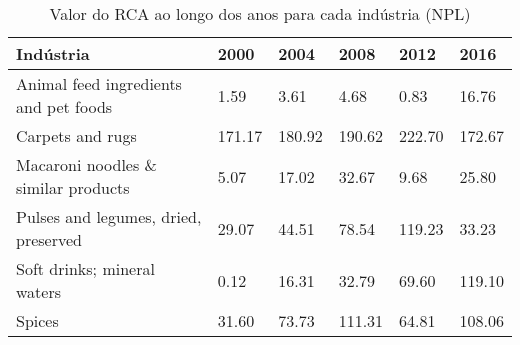 \begin{table}
\centering
\caption{Valor do RCA ao longo dos anos para cada indústria (NPL)}
\label{tab:ex3-tempo-NPL}
\begin{tabular}{p{6cm}p{1.5cm}p{1.5cm}p{1.5cm}p{1.5cm}p{1.5cm}}
\toprule
                            Indústria &   2000 &   2004 &   2008 &   2012 &   2016 \\
\midrule
Animal feed ingredients and pet foods &   1.59 &   3.61 &   4.68 &   0.83 &  16.76 \\
                     Carpets and rugs & 171.17 & 180.92 & 190.62 & 222.70 & 172.67 \\
  Macaroni noodles \& similar products &   5.07 &  17.02 &  32.67 &   9.68 &  25.80 \\
 Pulses and legumes, dried, preserved &  29.07 &  44.51 &  78.54 & 119.23 &  33.23 \\
          Soft drinks; mineral waters &   0.12 &  16.31 &  32.79 &  69.60 & 119.10 \\
                               Spices &  31.60 &  73.73 & 111.31 &  64.81 & 108.06 \\
\bottomrule
\end{tabular}
\end{table}
